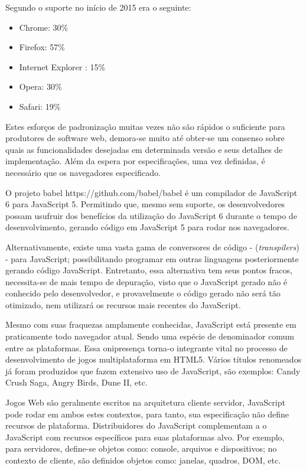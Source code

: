 Segundo \cite{ecmaSupport} o suporte no início de 2015 era o seguinte:

\begin{itemize}
    \item Chrome: 30\%
    \item Firefox: 57\%
    \item Internet Explorer : 15\%
    \item Opera: 30\%
    \item Safari: 19\%
\end{itemize}

Estes esforços de padronização muitas vezes não são rápidos
o suficiente para produtores de software web, demora-se muito até
obter-se um consenso sobre quais as funcionalidades desejadas em
determinada versão e seus detalhes de implementação. Além da
espera por especificações, uma vez definidas, é necessário que os
navegadores especificado.

O projeto babel https://github.com/babel/babel é um compilador de
JavaScript 6 para JavaScript 5. Permitindo que, mesmo sem suporte, os
desenvolvedores possam usufruir dos benefícios da utilização do
JavaScript 6 durante o tempo de desenvolvimento, gerando código em
JavaScript 5 para rodar nos navegadores.

Alternativamente, existe uma vasta gama de conversores de código -
(\textit{transpilers}) - para JavaScript; possibilitando programar
em outras linguagens posteriormente gerando código JavaScript.
Entretanto, essa alternativa tem seus pontos fracos, necessita-se
de mais tempo de depuração, visto que o JavaScript gerado não é
conhecido pelo desenvolvedor, e provavelmente o código gerado não
será tão otimizado, nem utilizará os recursos mais recentes do
JavaScript.

Mesmo com suas fraquezas amplamente conhecidas, JavaScript está
presente em praticamente todo navegador atual. Sendo uma espécie de
denominador comum entre as plataformas. Essa onipresença torna-o
integrante vital no processo de desenvolvimento de jogos multiplataforma
em HTML5. Vários títulos renomeados já foram produzidos que fazem
extensivo uso de JavaScript, são exemplos: Candy Crush Saga, Angry
Birds, Dune II, etc.

Jogos Web são geralmente escritos na arquitetura cliente servidor,
JavaScript pode rodar em ambos estes contextos, para tanto, sua
especificação não define recursos de plataforma. Distribuidores do
JavaScript complementam a o JavaScript com recursos específicos para
suas plataformas alvo. Por exemplo, para servidores, define-se objetos como:
console, arquivos e dispositivos; no contexto de cliente,
são definidos objetos como: janelas, quadros, DOM, etc.

